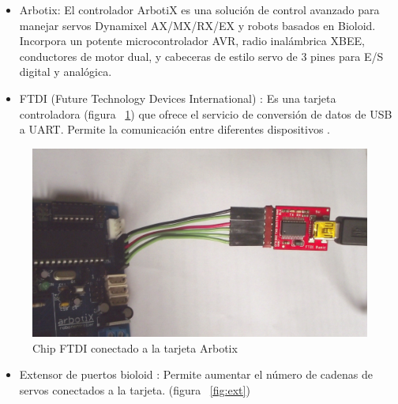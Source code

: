 \begin{itemize}
\item Arbotix: El controlador ArbotiX es una solución de control avanzado para manejar servos Dynamixel AX/MX/RX/EX y robots
basados en Bioloid. Incorpora un potente microcontrolador AVR, radio inalámbrica XBEE, conductores de motor dual, y cabeceras
de estilo servo de 3 pines para E/S digital y analógica.\cite{arbotix}

\end{itemize}


\begin{itemize}
\item FTDI (Future Technology Devices International) : Es una tarjeta controladora  (figura ~\ref{fig:ftdi}) que ofrece el servicio de conversión de  datos de USB a UART. Permite la comunicación entre diferentes dispositivos \cite{ftdi}.

\end{itemize}

\begin{figure}[hbtp]
\centering

\includegraphics[scale=0.06]{imagenes/DSCF1162.jpg}

\caption{Chip FTDI conectado a la tarjeta Arbotix}
\label{fig:ftdi}
\end{figure}

\begin{itemize}
\item Extensor de puertos bioloid : Permite aumentar el número de cadenas de servos conectados a la tarjeta. (figura ~\ref{fig:ext}) \cite{hub} 
\end{itemize}

